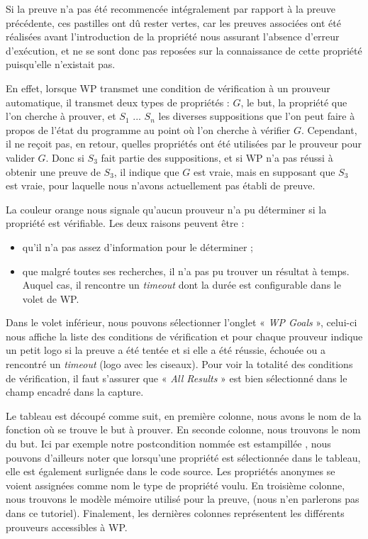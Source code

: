 Si  la preuve n'a pas été recommencée intégralement par rapport à la preuve
précédente, ces pastilles ont dû rester vertes, car les preuves associées ont
été réalisées avant l'introduction de la propriété nous assurant l'absence
d'erreur d'exécution, et ne se sont donc pas reposées sur la connaissance de
cette propriété puisqu'elle n'existait pas.



En effet, lorsque WP transmet une condition de vérification à un prouveur
automatique, il transmet deux types de propriétés : $G$, le but, la propriété
que l'on cherche à prouver, et $S_1$ ... $S_n$ les diverses suppositions que l'on
peut faire à propos de l'état du programme au point où l'on cherche à vérifier $G$.
Cependant, il ne reçoit pas, en retour, quelles propriétés ont été utilisées par
le prouveur pour valider $G$. Donc si $S_3$ fait partie des suppositions, et si
WP n'a pas réussi à obtenir une preuve de $S_3$, il indique que $G$ est vraie, mais
en supposant que $S_3$ est vraie, pour laquelle nous n'avons actuellement pas
établi de preuve.



La couleur orange nous signale qu'aucun prouveur n'a pu déterminer si la
propriété est vérifiable. Les deux raisons peuvent être :
\begin{itemize}
\item qu'il n'a pas assez d'information pour le déterminer ;
\item que malgré toutes ses recherches, il n'a pas pu trouver un résultat à
temps. Auquel cas, il rencontre un \textit{timeout} dont la durée est configurable
dans le volet de WP.
\end{itemize}


Dans le volet inférieur, nous pouvons sélectionner l'onglet « \textit{WP Goals} »,
celui-ci nous affiche la liste des conditions de vérification et pour chaque
prouveur indique un petit logo si la preuve a été tentée et si elle a été
réussie, échouée ou a rencontré un \textit{timeout} (logo avec les ciseaux).
Pour voir la totalité des conditions de vérification, il
faut s'assurer que « \textit{All Results} » est bien sélectionné dans le champ encadré
dans la capture.





Le tableau est découpé comme suit, en première colonne, nous avons le nom de la
fonction où se trouve le but à prouver. En seconde colonne, nous trouvons le nom
du but. Ici par exemple notre postcondition nommée est estampillée
, nous pouvons d'ailleurs noter
que lorsqu'une propriété est sélectionnée dans le tableau, elle est également
surlignée dans le code source. Les propriétés anonymes se voient assignées
comme nom le type de propriété voulu. En troisième colonne, nous trouvons le
modèle mémoire utilisé pour la preuve, (nous n'en parlerons pas dans ce
tutoriel). Finalement, les dernières colonnes représentent les différents
prouveurs accessibles à WP.



